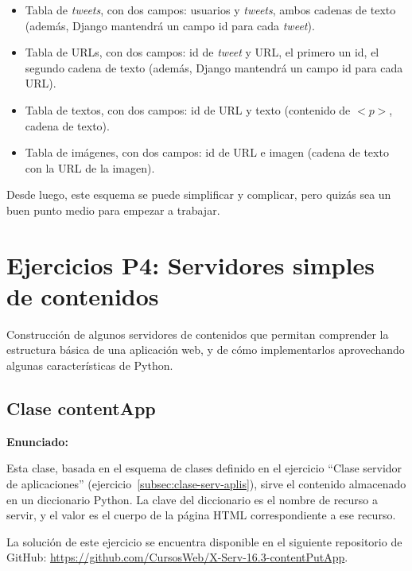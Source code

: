 \begin{itemize}
\item Tabla de \emph{tweets}, con dos campos: usuarios y \emph{tweets}, ambos cadenas de texto (además, Django mantendrá un campo id para cada \emph{tweet}).
\item Tabla de URLs, con dos campos: id de \emph{tweet} y URL, el primero un id, el segundo cadena de texto (además, Django mantendrá un campo id para cada URL).
\item Tabla de textos, con dos campos: id de URL y texto (contenido de $<p>$, cadena de texto).
\item Tabla de imágenes, con dos campos: id de URL e imagen (cadena de texto con la URL de la imagen).
\end{itemize}

Desde luego, este esquema se puede simplificar y complicar, pero quizás sea un buen punto medio para empezar a trabajar.

\section{Ejercicios P4: Servidores simples de contenidos}

Construcción de algunos servidores de contenidos que permitan comprender la estructura básica de una aplicación web, y de cómo implementarlos aprovechando algunas características de Python.

\subsection{Clase contentApp}
\label{subsec:contentapp}

\textbf{Enunciado:}

Esta clase, basada en el esquema de clases definido en el ejercicio ``Clase servidor de aplicaciones'' (ejercicio~\ref{subsec:clase-serv-aplis}), sirve el contenido almacenado en un diccionario Python. La clave del diccionario es el nombre de recurso a servir, y el valor es el cuerpo de la página HTML correspondiente a ese recurso.

La solución de este ejercicio se encuentra disponible en el siguiente repositorio de GitHub:
\url{https://github.com/CursosWeb/X-Serv-16.3-contentPutApp}.

